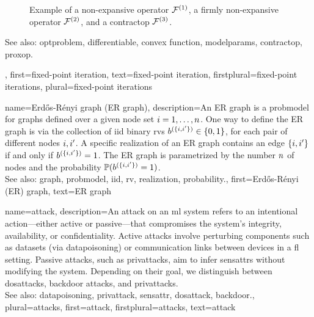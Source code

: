 {{\begin{figure}[H]
\begin{center}
			\end{center} 
			\caption{Example of a non-expansive operator $\mathcal{F}^{(1)}$, a firmly non-expansive operator $\mathcal{F}^{(2)}$, and 
				a \gls{contractop} $\mathcal{F}^{(3)}$. \label{fig_examples_nonexp_dict}}
		\end{figure} 
		See also: \gls{optproblem}, \gls{differentiable}, \gls{convex} \gls{function}, \gls{modelparams}, \gls{contractop}, \gls{proxop}.},
	first={fixed-point iteration},
	text={fixed-point iteration},
	firstplural={fixed-point iterations}, 
	plural={fixed-point iterations}
}


{name={Erd\H{o}s-R\'enyi graph (ER graph)},
	description={An ER  \gls{graph} is a \gls{probmodel} for \glspl{graph} defined over 
		a given node set $i=1, \ldots, n$. One way to define the ER \gls{graph} is 
		via the collection of \gls{iid} binary \glspl{rv} $b^{(\{i,i'\})} \in \{0,1\}$, 
		for each pair of different nodes $i, i'$. A specific \gls{realization}  
		of an ER \gls{graph} contains an edge $\{i,i'\}$ if and only if 
		$b^{(\{i,i'\})}=1$. The ER \gls{graph} is parametrized by the 
		number $n$ of nodes and the \gls{probability} $\mathbb{P}({b^{(\{i,i'\})}=1})$. 
		\\
		See also: \gls{graph}, \gls{probmodel}, \gls{iid}, \gls{rv}, \gls{realization}, \gls{probability}.},
	first={Erd\H{o}s-R\'enyi (ER) graph},
	text={ER graph}
}

{name={attack},  
	description={An attack on an \gls{ml} system refers to an intentional action—either 
		active or passive—that compromises the system's integrity, availability, or confidentiality. 
		Active attacks involve perturbing components such as \glspl{dataset} (via \gls{datapoisoning}) 
		or communication links between \glspl{device} in a \gls{fl} setting. Passive attacks, 
		such as \glspl{privattack}, aim to infer \glspl{sensattr} without modifying the system. 
		Depending on their goal, we distinguish between \glspl{dosattack}, \gls{backdoor} attacks, and \glspl{privattack}.
		\\
		See also:  \gls{datapoisoning}, \gls{privattack}, \gls{sensattr}, \gls{dosattack}, \gls{backdoor}.},
	plural={attacks}, 
	first={attack},
	firstplural={attacks},
	text={attack}
}

